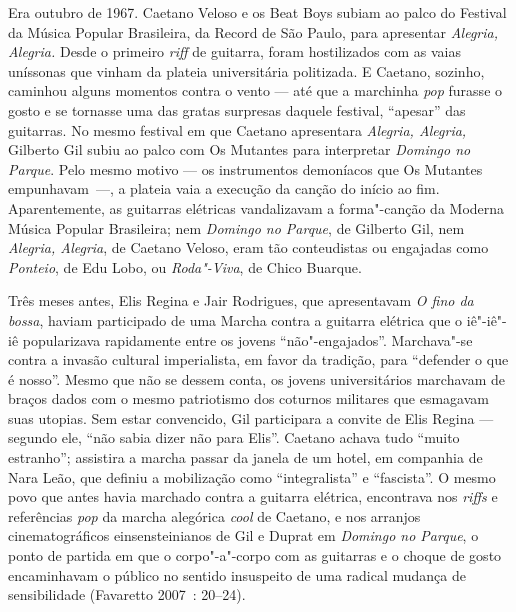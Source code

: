 Era outubro de 1967. Caetano Veloso e os Beat Boys
subiam ao palco do  Festival da Música Popular Brasileira, da 
Record de São Paulo, para apresentar \emph{Alegria, Alegria. }Desde o
primeiro \emph{riff} de guitarra, foram hostilizados com as vaias
uníssonas que vinham da plateia universitária politizada. E Caetano,
sozinho, caminhou alguns momentos contra o vento --- até que a marchinha
\emph{pop} furasse o gosto e se tornasse uma das gratas surpresas
daquele festival, ``apesar'' das guitarras. No mesmo festival em que
Caetano apresentara \emph{Alegria, Alegria,} Gilberto Gil subiu ao palco
com Os Mutantes para interpretar \emph{Domingo no Parque}. Pelo mesmo
motivo --- os instrumentos demoníacos que Os Mutantes empunhavam~---, a
plateia vaia a execução da canção do início ao fim. Aparentemente, as
guitarras elétricas vandalizavam a forma"-canção da Moderna Música
Popular Brasileira; nem \emph{Domingo no Parque}, de Gilberto Gil, nem
\emph{Alegria, Alegria}, de Caetano Veloso, eram tão conteudistas ou
engajadas como \emph{Ponteio}, de Edu Lobo, ou \emph{Roda"-Viva},
de Chico Buarque.

Três meses antes, Elis Regina e Jair Rodrigues, que apresentavam \emph{O
fino da bossa}, haviam participado de uma Marcha contra a guitarra
elétrica que o iê"-iê"-iê popularizava rapidamente entre os jovens
``não"-engajados''. Marchava"-se contra a invasão cultural imperialista,
em favor da tradição, para ``defender o que é nosso''. Mesmo que não se
dessem conta, os jovens universitários marchavam de braços dados com o
mesmo patriotismo dos coturnos militares que esmagavam suas utopias. Sem
estar convencido, Gil participara a convite de Elis Regina --- segundo
ele, ``não sabia dizer não para Elis''. Caetano achava tudo ``muito
estranho''; assistira a marcha passar da janela de um hotel, em
companhia de Nara Leão, que definiu a mobilização como ``integralista''
e ``fascista''. O mesmo povo que antes havia marchado contra a guitarra
elétrica, encontrava nos \emph{riffs }e referências \emph{pop} da marcha
alegórica \emph{cool }de Caetano, e nos arranjos cinematográficos
einsensteinianos de Gil e Duprat em \emph{Domingo no Parque}, o
ponto de partida em que o corpo"-a"-corpo com as guitarras e o choque de
gosto encaminhavam o público no sentido insuspeito de uma radical
mudança de sensibilidade (Favaretto 2007~: 20--24).

